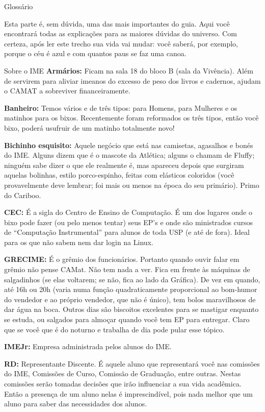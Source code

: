 \begin{secao}{Glossário}

Esta parte é, sem dúvida, uma das mais importantes do guia. Aqui você
encontrará todas as explicações para as maiores dúvidas do universo. Com
certeza, após ler este trecho sua vida vai mudar: você saberá, por exemplo,
porque o céu é azul e com quantos paus se faz uma canoa.

\begin{subsecao}{Sobre o IME}
{\bf Armários:} Ficam na sala 18 do bloco B (sala da Vivência). Além de
servirem para aliviar imeanos do excesso de peso dos livros e cadernos, ajudam
o CAMAT a sobreviver financeiramente.

{\bf Banheiro:} Temos vários e de três tipos: para Homens, para Mulheres e os
matinhos para os bixos. Recentemente foram reformados os três tipos, então você
bixo, poderá usufruir de um matinho totalmente novo!

{\bf Bichinho esquisito:} Aquele negócio que está nas camisetas, agasalhos e
bonés do IME. Alguns dizem que é o mascote da Atlética; alguns o chamam de
Fluffy; ninguém sabe dizer o que ele realmente é, mas apareceu depois que
surgiram aquelas bolinhas, estilo porco-espinho, feitas com elásticos
coloridos (você provavelmente deve lembrar; foi mais ou menos na época do seu
primário). Primo do Cariboo.

{\bf CEC:} É a sigla do Centro de Ensino de Computação. É um dos lugares onde o
bixo pode fazer (ou pelo menos tentar) seus EP's e onde são ministrados cursos
de ``Computação Instrumental'' para alunos de toda USP (e até de fora). Ideal
para os que não sabem nem dar login na Linux.

{\bf GRECIME:} É o grêmio dos funcionários. Portanto quando ouvir falar em
grêmio não pense CAMat. Não tem nada a ver. Fica em frente às máquinas de
salgadinhos (se elas voltarem; se não, fica ao lado da Gráfica). De vez em
quando, até 16h ou 20h (varia numa função quadraticamente proporcional ao
bom-humor do vendedor e ao próprio vendedor, que não é único), tem bolos
maravilhosos de dar água na boca. Outros dias são biscoitos excelentes para se
mastigar enquanto se estuda, ou salgados para almoçar quando você tem EP para
entregar. Claro que se você que é do noturno e trabalha de dia pode pular esse
tópico.

{\bf IMEJr:} Empresa administrada pelos alunos do IME.

{\bf RD:} Representante Discente. É aquele aluno que representará você nas
comissões do IME, Comissões de Curso, Comissão de Graduação, entre outras.
Nestas comissões serão tomadas decisões que irão influenciar a sua vida
acadêmica. Então a presença de um aluno nelas é imprescindível, pois nada
melhor que um aluno para saber das necessidades dos alunos.


\end{subsecao}
\end{secao}
